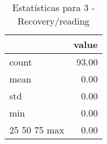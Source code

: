 \begin{table}[htbp]
\caption{Estatísticas para 3 - Recovery/reading}
\label{tab:3_-_recovery_reading_summary}
\begin{tabular}{lr}
\toprule
 & value \\
\midrule
count & 93.00 \\
mean & 0.00 \\
std & 0.00 \\
min & 0.00 \\
25%
50%
75%
max & 0.00 \\
\bottomrule
\end{tabular}
\end{table}
